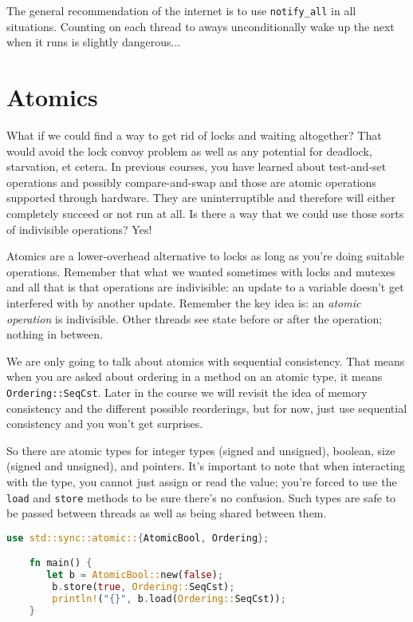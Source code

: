 The general recommendation of the internet is to use \texttt{notify\_all} in all situations. Counting on each thread to aways unconditionally wake up the next when it runs is slightly dangerous...

\section*{Atomics}
What if we could find a way to get rid of locks and waiting altogether? That would avoid the lock convoy problem as well as any potential for deadlock, starvation, et cetera. In previous courses, you have learned about test-and-set operations and possibly compare-and-swap and those are atomic operations supported through hardware. They are uninterruptible and therefore will either completely succeed or not run at all. Is there a way that we could use those sorts of indivisible operations? Yes!

Atomics are a lower-overhead alternative to
locks as long as you're doing suitable operations. Remember that what we wanted sometimes with locks and mutexes and all that is that operations are indivisible: an update to a variable doesn't get interfered with by another update. Remember the key idea is: an \textit{atomic operation} is indivisible. Other threads see state before or after the operation; nothing in between.

We are only going to talk about atomics with sequential consistency. That means when you are asked about ordering in a method on an atomic type, it means \texttt{Ordering::SeqCst}. Later in the course we will revisit the idea of memory consistency and the different possible reorderings, but for now, just use sequential consistency and you won't get surprises.

So there are atomic types for integer types (signed and unsigned), boolean, size (signed and unsigned), and pointers. It's important to note that when interacting with the type, you cannot just assign or read the value; you're forced to use the \texttt{load} and \texttt{store} methods to be sure there's no confusion. Such types are safe to be passed between threads as well as being shared between them. 

\begin{lstlisting}[language=Rust]
    use std::sync::atomic::{AtomicBool, Ordering};

    fn main() {
       let b = AtomicBool::new(false);
        b.store(true, Ordering::SeqCst);
        println!("{}", b.load(Ordering::SeqCst));
    }
\end{lstlisting}

